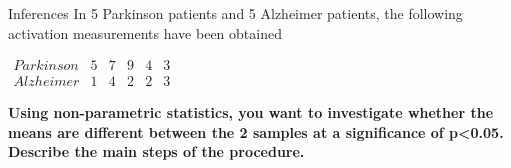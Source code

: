 \documentclass{beamer}
\begin{document}
\begin{frame}{Inferences}
  In 5 Parkinson patients and 5 Alzheimer patients, the following activation measurements have been obtained
  
  \smallskip
  
  $
  \begin{array}{cccccc}
    Parkinson &5 &7 &9 &4 &3\\
    Alzheimer &1 &4 &2 &2 &3
  \end{array}
  $
  
  \smallskip
  
  \textbf{Using non-parametric statistics, you want to investigate whether the means are different between the 2 samples at a significance of p<0.05. Describe the main steps of the procedure.}
  
\end{frame}
\end{document}
